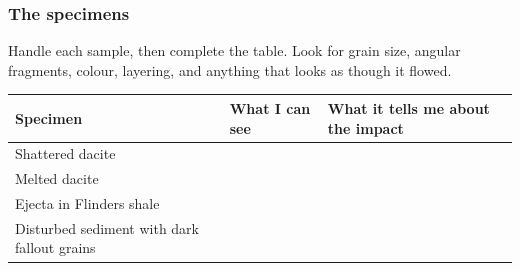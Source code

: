 \documentclass[11pt,a4paper]{article}
\newenvironment{fillin}[1][2.6]{\begingroup\renewcommand{\arraystretch}{#1}}{\endgroup}
\begin{document}
\subsubsection{The specimens}

Handle each sample, then complete the table. Look for grain size, angular
fragments, colour, layering, and anything that looks as though it flowed.

\begin{center}
\begin{fillin}[2.9]
\begin{tabular}{|p{4.3cm}|p{5.4cm}|p{4.6cm}|}
\hline
\textbf{Specimen} & \textbf{What I can see} & \textbf{What it tells me about the impact} \\ \hline
Shattered dacite & & \\ \hline
Melted dacite & & \\ \hline
Ejecta in Flinders shale & & \\ \hline
Disturbed sediment with dark fallout grains & & \\ \hline
\end{tabular}
\end{fillin}
\end{center}
\end{document}
